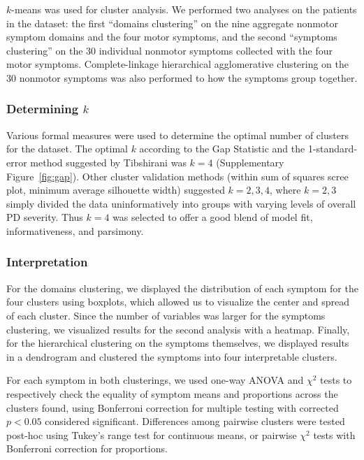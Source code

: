 \documentclass[preprint,5p]{elsarticle} %
\begin{document}
$k$-means was used for cluster analysis. We performed two analyses on the
patients in the dataset: the first ``domains clustering'' on the nine aggregate nonmotor symptom
domains and the four motor symptoms, and the second ``symptoms clustering'' on the 30 individual
nonmotor symptoms collected with the four motor symptoms. Complete-linkage
hierarchical agglomerative clustering on the 30 nonmotor symptoms was also performed to how the symptoms group
together.

\subsubsection{Determining $k$}

Various formal measures were used to determine the optimal number of clusters for the dataset. The
optimal $k$ according to the Gap Statistic and the 1-standard-error method suggested by
Tibshirani\cite{tibshirani01gap} was $k = 4$ (Supplementary Figure~\ref{fig:gap}). Other cluster validation
methods (within sum of squares scree plot, minimum average silhouette width) suggested $k =
2, 3, 4$, where $k = 2, 3$ simply divided the data uninformatively into groups with varying levels
of overall PD severity. Thus $k = 4$ was selected to offer a good blend of model fit,
informativeness, and parsimony.

\subsubsection{Interpretation}

For the domains clustering, we displayed the distribution of each symptom for the four
clusters using boxplots, which allowed us to visualize the center and spread of each cluster. Since
the number of variables was larger for the symptoms clustering, we visualized results for the
second analysis with a heatmap. Finally, for the hierarchical clustering on the symptoms
themselves, we displayed results in a dendrogram and clustered the symptoms into four interpretable
clusters.

For each symptom in both clusterings, we used one-way ANOVA and $\chi^2$ tests to respectively
check the equality of symptom means and proportions across the clusters found, using Bonferroni
correction for multiple testing with corrected $p < 0.05$ considered significant. Differences among
pairwise clusters were tested post-hoc using Tukey's range test for continuous means, or pairwise
$\chi^2$ tests with Bonferroni correction for proportions.
\end{document}
